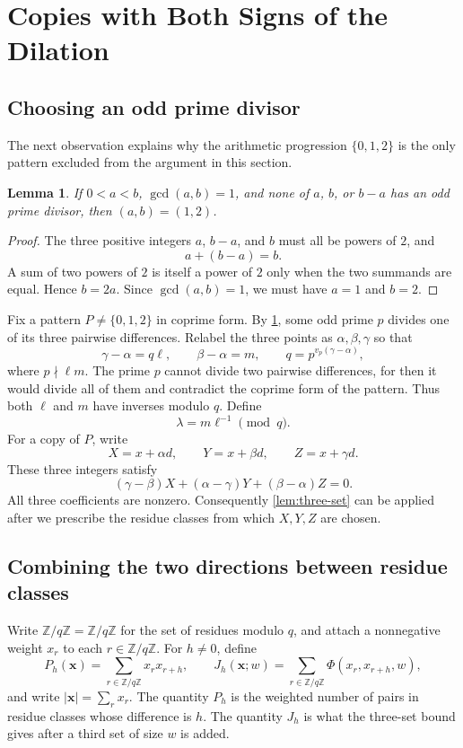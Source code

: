 \documentclass[11pt]{article}
\numberwithin{equation}{section}
\newtheorem{lemma}[lemma]{Lemma}
\theoremstyle{remark}
\newcommand{\Fq}{\mathbb Z/q\mathbb Z}
\begin{document}
\section{Copies with Both Signs of the Dilation}
\label{sec:both-signs}
\subsection{Choosing an odd prime divisor}
The next observation explains why the arithmetic progression
$\{0,1,2\}$ is the only pattern excluded from the argument in this section.
\begin{lemma}\label{lem:odd-prime}
If $0<a<b$, $\gcd(a,b)=1$, and none of $a$, $b$, or $b-a$ has an odd
prime divisor, then $(a,b)=(1,2)$.
\end{lemma}
\begin{proof}
The three positive integers $a$, $b-a$, and $b$ must all be powers of $2$,
and
\[
 a+(b-a)=b.
\]
A sum of two powers of $2$ is itself a power of $2$ only when the two
summands are equal.  Hence $b=2a$.  Since $\gcd(a,b)=1$, we must have
$a=1$ and $b=2$.
\end{proof}

Fix a pattern $P\ne\{0,1,2\}$ in coprime form.  By
\cref{lem:odd-prime}, some odd prime $p$ divides one of its three pairwise
differences.  Relabel the three points as $\alpha,\beta,\gamma$ so that
\begin{equation}\label{eq:alpha-beta-gamma}
 \gamma-\alpha=q\ell,
 \qquad
 \beta-\alpha=m,
 \qquad
 q=p^{v_p(\gamma-\alpha)},
\end{equation}
where $p\nmid\ell m$.  The prime $p$ cannot divide two pairwise differences,
for then it would divide all of them and contradict the coprime form of the
pattern.  Thus both $\ell$ and $m$ have inverses modulo $q$.  Define
\begin{equation}\label{eq:def-lambda}
 \lambda=m\ell^{-1}\pmod q.
\end{equation}
For a copy of $P$, write
\[
 X=x+\alpha d,
 \qquad Y=x+\beta d,
 \qquad Z=x+\gamma d.
\]
These three integers satisfy
\begin{equation}\label{eq:pattern-relation}
 (\gamma-\beta)X+(\alpha-\gamma)Y+(\beta-\alpha)Z=0.
\end{equation}
All three coefficients are nonzero.  Consequently
\cref{lem:three-set} can be applied after we prescribe the residue classes
from which $X,Y,Z$ are chosen.

\subsection{Combining the two directions between residue classes}
Write $\Fq=\mathbb Z/q\mathbb Z$ for the set of residues modulo $q$, and
attach a nonnegative weight $x_r$ to each $r\in\Fq$.  For $h\ne0$, define
\begin{equation}\label{eq:def-Ph-Jh}
 P_h(\mathbf x)=\sum_{r\in\Fq}x_rx_{r+h},
 \qquad
 J_h(\mathbf x;w)=\sum_{r\in\Fq}\Phi(x_r,x_{r+h},w),
\end{equation}
and write $|\mathbf x|=\sum_r x_r$.  The quantity $P_h$ is the weighted
number of pairs in residue classes whose difference is $h$.  The quantity
$J_h$ is what the three-set bound gives after a third set of size $w$ is
added.
\end{document}
